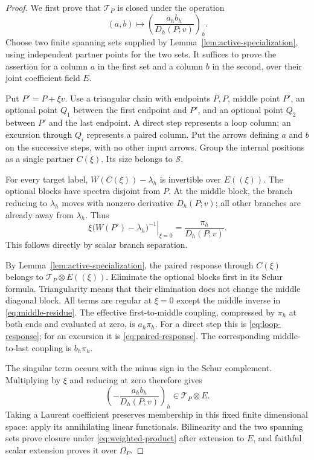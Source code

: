 \begin{proof}
We first prove that $\mathcal T_P$ is closed under the operation
\begin{equation}
(a,b)\longmapsto
 \left(\frac{a_hb_h}{D_h(P;v)}\right)_h.
 \label{eq:weighted-product}
\end{equation}
Choose two finite spanning sets supplied by
Lemma~\ref{lem:active-specialization}, using independent partner
points for the two sets.  It suffices to prove the assertion for a
column $a$ in the first set and a column $b$ in the second, over their
joint coefficient field $E$.

Put $P'=P+\xi v$.  Use a triangular chain with endpoints $P,P$,
middle point $P'$, an optional point $Q_1$ between the first endpoint
and $P'$, and an optional point $Q_2$ between $P'$ and the last
endpoint.  A direct step represents a loop column; an excursion
through $Q_i$ represents a paired column.  Put the arrows defining
$a$ and $b$ on the successive steps, with no other input arrows.
Group the internal positions as a single partner $C(\xi)$.  Its
size belongs to $\mathcal S$.

For every target label, $W(C(\xi))-\lambda_h$ is invertible over
$E((\xi))$.  The optional blocks have spectra disjoint from $P$.
At the middle block, the branch reducing to $\lambda_h$ moves with
nonzero derivative $D_h(P;v)$; all other branches are already away
from $\lambda_h$.  Thus
\begin{equation}
\left.\xi\bigl(W(P')-\lambda_h\bigr)^{-1}\right|_{\xi=0}
   =\frac{\pi_h}{D_h(P;v)}.
 \label{eq:middle-residue}
\end{equation}
This follows directly by scalar branch separation.

By Lemma~\ref{lem:active-specialization}, the paired response through
$C(\xi)$ belongs to $\mathcal T_P\otimes E((\xi))$.  Eliminate
the optional blocks first in its Schur formula.  Triangularity means
that their elimination does not change the middle diagonal block.
All terms are regular at $\xi=0$ except the middle inverse in
\eqref{eq:middle-residue}.  The effective first-to-middle coupling,
compressed by $\pi_h$ at both ends and evaluated at zero, is
$a_h\pi_h$.  For a direct step this is
\eqref{eq:loop-response}; for an excursion it is
\eqref{eq:paired-response}.  The corresponding middle-to-last
coupling is $b_h\pi_h$.

The singular term occurs with the minus sign in the Schur
complement.  Multiplying by $\xi$ and reducing at zero therefore
gives
\[
 \left(-\frac{a_hb_h}{D_h(P;v)}\right)_h
       \in\mathcal T_P\otimes E.
\]
Taking a Laurent coefficient preserves membership in this fixed
finite dimensional space: apply its annihilating linear functionals.
Bilinearity and the two spanning sets prove closure under
\eqref{eq:weighted-product} after extension to $E$, and faithful
scalar extension proves it over $\Omega_P$.


\end{proof}
